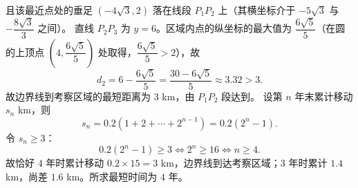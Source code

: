 \begin{answer}
且该最近点处的垂足 $\left(-4\sqrt3,2\right)$ 落在线段 $P_1P_2$ 上（其横坐标介于 $-5\sqrt3$ 与 $-\dfrac{8\sqrt3}{3}$ 之间）。
直线 $P_2P_3$ 为 $y=6$。区域内点的纵坐标的最大值为 $\dfrac{6\sqrt5}{5}$（在圆的上顶点 $\left(4,\dfrac{6\sqrt5}{5}\right)$ 处取得，$\dfrac{6\sqrt5}{5}>2$），故
\nopagebreak[4]
\[d_2=6-\frac{6\sqrt5}{5}=\frac{30-6\sqrt5}{5}\approx3.32>3.\]
故边界线到考察区域的最短距离为 $3$ km，由 $P_1P_2$ 段达到。
设第 $n$ 年末累计移动 $s_n$ km，则
\nopagebreak[4]
\[s_n=0.2(1+2+\cdots+2^{n-1})=0.2(2^n-1).\]
令 $s_n\geqslant3$：
\nopagebreak[4]
\[0.2(2^n-1)\geqslant3\iff2^n\geqslant16\iff n\geqslant4.\]
故恰好 $4$ 年时累计移动 $0.2\times15=3$ km，边界线到达考察区域；$3$ 年时累计 $1.4$ km，尚差 $1.6$ km。所求最短时间为 $4$ 年。


\end{answer}
